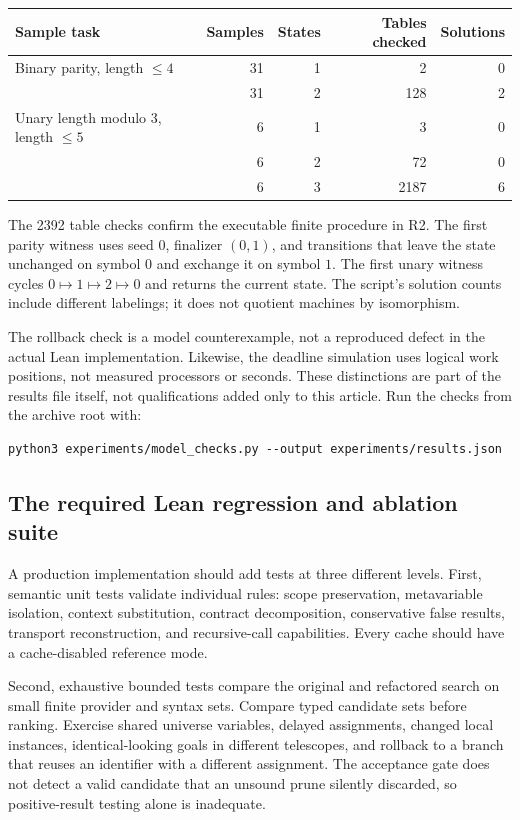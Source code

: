 \documentclass[11pt,a4paper]{article}
\theoremstyle{definition}
\theoremstyle{remark}
\begin{document}
\begin{center}
\begin{tabular}{@{}lrrrr@{}}
\toprule
Sample task & Samples & States & Tables checked & Solutions\\
\midrule
Binary parity, length $\leq4$ & 31 & 1 & 2 & 0\\
 & 31 & 2 & 128 & 2\\
Unary length modulo 3, length $\leq5$ & 6 & 1 & 3 & 0\\
 & 6 & 2 & 72 & 0\\
 & 6 & 3 & 2187 & 6\\
\bottomrule
\end{tabular}
\end{center}
The 2392 table checks confirm the executable finite procedure in R2. The first
parity witness uses seed $0$, finalizer $(0,1)$, and transitions that leave the
state unchanged on symbol $0$ and exchange it on symbol $1$. The first unary
witness cycles $0\mapsto1\mapsto2\mapsto0$ and returns the current state.
The script's solution counts include different labelings; it does not quotient
machines by isomorphism.

The rollback check is a model counterexample, not a reproduced defect in the
actual Lean implementation. Likewise, the deadline simulation uses logical
work positions, not measured processors or seconds. These distinctions are
part of the results file itself, not qualifications added only to this article.
Run the checks from the archive root with:
\begin{lstlisting}
python3 experiments/model_checks.py --output experiments/results.json
\end{lstlisting}

\subsection{The required Lean regression and ablation suite}
A production implementation should add tests at three different levels.
First, semantic unit tests validate individual rules: scope preservation,
metavariable isolation, context substitution, contract decomposition,
conservative false results, transport reconstruction, and recursive-call
capabilities. Every cache should have a cache-disabled reference mode.

Second, exhaustive bounded tests compare the original and refactored search on
small finite provider and syntax sets. Compare typed candidate sets before
ranking. Exercise shared universe variables, delayed assignments, changed local
instances, identical-looking goals in different telescopes, and rollback to a
branch that reuses an identifier with a different assignment. The acceptance
gate does not detect a valid candidate that an unsound prune silently discarded,
so positive-result testing alone is inadequate.
\end{document}
